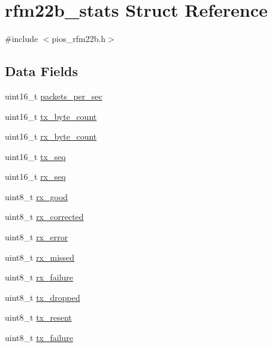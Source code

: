 \hypertarget{structrfm22b__stats}{\section{rfm22b\-\_\-stats \-Struct \-Reference}
\label{structrfm22b__stats}
}


{\ttfamily \#include $<$pios\-\_\-rfm22b.\-h$>$}

\subsection*{\-Data \-Fields}
\begin{DoxyCompactItemize}
\item 
uint16\-\_\-t \hyperlink{structrfm22b__stats_a9ed3bba20847dcee3b0397c210b22d3d}{packets\-\_\-per\-\_\-sec}
\item 
uint16\-\_\-t \hyperlink{structrfm22b__stats_a3f3b0ee5d6c3557da05b35b54102da71}{tx\-\_\-byte\-\_\-count}
\item 
uint16\-\_\-t \hyperlink{structrfm22b__stats_a4a173cf22afe7f957dc268d65ab1833c}{rx\-\_\-byte\-\_\-count}
\item 
uint16\-\_\-t \hyperlink{structrfm22b__stats_a8279ef420f8e1d3c6773b8cb528f5122}{tx\-\_\-seq}
\item 
uint16\-\_\-t \hyperlink{structrfm22b__stats_ad73defbcdc26cc6438d0f28723a909e7}{rx\-\_\-seq}
\item 
uint8\-\_\-t \hyperlink{structrfm22b__stats_aa9b17c04f89e42496f776f7cac5b549d}{rx\-\_\-good}
\item 
uint8\-\_\-t \hyperlink{structrfm22b__stats_aff132143dc1206acab2aa0972429aaba}{rx\-\_\-corrected}
\item 
uint8\-\_\-t \hyperlink{structrfm22b__stats_aa732f9f0055fff25329e07f6b4cce221}{rx\-\_\-error}
\item 
uint8\-\_\-t \hyperlink{structrfm22b__stats_a10156bfde7480e15c39ba077da5f687f}{rx\-\_\-missed}
\item 
uint8\-\_\-t \hyperlink{structrfm22b__stats_a4acb04b442511cd543677d8d8e7b4a81}{rx\-\_\-failure}
\item 
uint8\-\_\-t \hyperlink{structrfm22b__stats_a40ecedccb96317654da5118ca167bfe4}{tx\-\_\-dropped}
\item 
uint8\-\_\-t \hyperlink{structrfm22b__stats_aad4359c902f65048dd74b5b5a4d9482d}{tx\-\_\-resent}
\item 
uint8\-\_\-t \hyperlink{structrfm22b__stats_ae443df4225a025395b7fa6caea562a74}{tx\-\_\-failure}
\item 

\end{DoxyCompactItemize}
